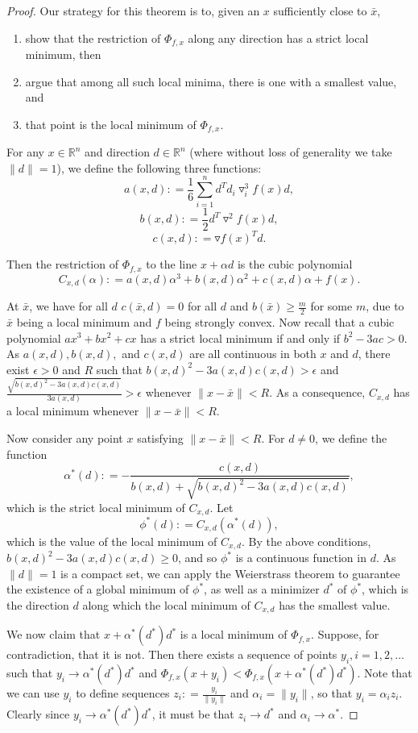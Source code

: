 \documentclass[10pt,a4paper]{amsart}
\def \Hess{\triangledown^2}
\def \R{\mathbb{R}}
\def \Rn{\R^n}
\def \defeq{\mathrel{\mathop{:}}=}
\def \grad{\triangledown}
\def \xbar{\bar{x}}
\begin{document}
\begin{proof}
Our strategy for this theorem is to, given an $x$ sufficiently close to $\xbar$,
\begin{enumerate}
    \item show that the restriction of $\Phi_{f,x}$ along any direction has a strict local minimum, then
    \item argue that among all such local minima, there is one with a smallest value, and
    \item that point is the local minimum of $\Phi_{f,x}$.
\end{enumerate}
For any $x \in \Rn$ and direction $d \in \Rn$ (where without loss of generality we take $\|d\| = 1$), we define the following three functions:
$$a(x,d) \defeq \frac{1}{6}\sum_{i=1}^n d^T d_i \grad_i^3 f(x)d,$$
$$b(x,d) \defeq \frac{1}{2} d^T\Hess f(x)d,$$
$$c(x,d) \defeq \grad f(x)^Td.$$

Then the restriction of $\Phi_{f,x}$ to the line $x + \alpha d$ is the cubic polynomial
$$C_{x,d}(\alpha) \defeq a(x, d)\alpha^3 + b(x, d)\alpha^2 + c(x, d)\alpha + f(x).$$

At $\xbar$, we have for all $d$ $c(\xbar,d) = 0$ for all $d$ and $b(\xbar) \ge \frac{m}{2}$ for some $m$, due to $\xbar$ being a local minimum and $f$ being strongly convex. Now recall that a cubic polynomial $ax^3 + bx^2 + cx$ has a strict local minimum if and only if $b^2 - 3ac > 0$. As $a(x,d), b(x,d),$ and $c(x,d)$ are all continuous in both $x$ and $d$, there exist $\epsilon > 0$ and $R$ such that $b(x, d)^2 - 3a(x, d)c(x, d) > \epsilon$ and $\frac{\sqrt{b(x, d)^2 - 3a(x, d)c(x, d)}}{3a(x,d)} > \epsilon$ whenever $\|x - \xbar\| < R$. As a consequence, $C_{x,d}$ has a local minimum whenever $\|x - \xbar\| < R$.

Now consider any point $x$ satisfying $\|x - \xbar\| < R$. For $d \ne 0$, we define the function
$$\alpha^*(d) \defeq -\frac{c(x,d)}{b(x,d) + \sqrt{b(x,d)^2 - 3a(x,d)c(x,d)}},$$
which is the strict local minimum of $C_{x,d}$. Let
$$\phi^*(d) \defeq C_{x,d}(\alpha^*(d)),$$
which is the value of the local minimum of $C_{x,d}$. By the above conditions, $b(x,d)^2 - 3a(x,d)c(x,d) \ge 0$, and so $\phi^*$ is a continuous function in $d$. As $\|d\| = 1$ is a compact set, we can apply the Weierstrass theorem to guarantee the existence of a global minimum of $\phi^*$, as well as a minimizer $d^*$ of $\phi^*$, which is the direction $d$ along which the local minimum of $C_{x,d}$ has the smallest value.

We now claim that $x + \alpha^*(d^*)d^*$ is a local minimum of $\Phi_{f,x}$. Suppose, for contradiction, that it is not. Then there exists a sequence of points $y_i, i = 1, 2, \ldots$ such that $y_i \to \alpha^*(d^*) d^*$ and $\Phi_{f,x}(x+y_i) < \Phi_{f,x}(x+\alpha^*(d^*)d^*)$. Note that we can use $y_i$ to define sequences $z_i \defeq \frac{y_i}{\|y_i\|}$ and $\alpha_i = \|y_i\|$, so that $y_i = \alpha_iz_i$. Clearly since $y_i \to \alpha^*(d^*)d^*$, it must be that $z_i \to d^*$ and $\alpha_i \to \alpha^*$.


\end{proof}
\end{document}
